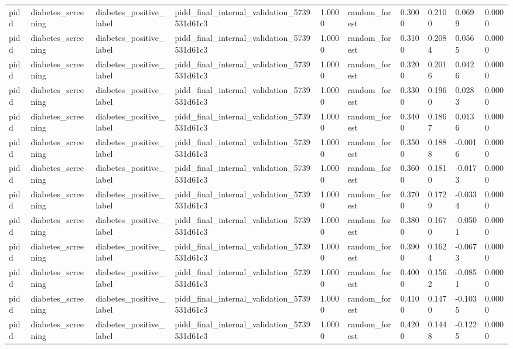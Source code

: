 \begin{tabular}{llllllllll}
pidd & diabetes\_screening & diabetes\_positive\_label & pidd\_final\_internal\_validation\_5739531d61c3 & 1.0000 & random\_forest & 0.3000 & 0.2100 & 0.0699 & 0.0000 \\
pidd & diabetes\_screening & diabetes\_positive\_label & pidd\_final\_internal\_validation\_5739531d61c3 & 1.0000 & random\_forest & 0.3100 & 0.2084 & 0.0565 & 0.0000 \\
pidd & diabetes\_screening & diabetes\_positive\_label & pidd\_final\_internal\_validation\_5739531d61c3 & 1.0000 & random\_forest & 0.3200 & 0.2016 & 0.0426 & 0.0000 \\
pidd & diabetes\_screening & diabetes\_positive\_label & pidd\_final\_internal\_validation\_5739531d61c3 & 1.0000 & random\_forest & 0.3300 & 0.1960 & 0.0283 & 0.0000 \\
pidd & diabetes\_screening & diabetes\_positive\_label & pidd\_final\_internal\_validation\_5739531d61c3 & 1.0000 & random\_forest & 0.3400 & 0.1867 & 0.0136 & 0.0000 \\
pidd & diabetes\_screening & diabetes\_positive\_label & pidd\_final\_internal\_validation\_5739531d61c3 & 1.0000 & random\_forest & 0.3500 & 0.1888 & -0.0016 & 0.0000 \\
pidd & diabetes\_screening & diabetes\_positive\_label & pidd\_final\_internal\_validation\_5739531d61c3 & 1.0000 & random\_forest & 0.3600 & 0.1810 & -0.0173 & 0.0000 \\
pidd & diabetes\_screening & diabetes\_positive\_label & pidd\_final\_internal\_validation\_5739531d61c3 & 1.0000 & random\_forest & 0.3700 & 0.1729 & -0.0334 & 0.0000 \\
pidd & diabetes\_screening & diabetes\_positive\_label & pidd\_final\_internal\_validation\_5739531d61c3 & 1.0000 & random\_forest & 0.3800 & 0.1670 & -0.0501 & 0.0000 \\
pidd & diabetes\_screening & diabetes\_positive\_label & pidd\_final\_internal\_validation\_5739531d61c3 & 1.0000 & random\_forest & 0.3900 & 0.1624 & -0.0673 & 0.0000 \\
pidd & diabetes\_screening & diabetes\_positive\_label & pidd\_final\_internal\_validation\_5739531d61c3 & 1.0000 & random\_forest & 0.4000 & 0.1562 & -0.0851 & 0.0000 \\
pidd & diabetes\_screening & diabetes\_positive\_label & pidd\_final\_internal\_validation\_5739531d61c3 & 1.0000 & random\_forest & 0.4100 & 0.1470 & -0.1035 & 0.0000 \\
pidd & diabetes\_screening & diabetes\_positive\_label & pidd\_final\_internal\_validation\_5739531d61c3 & 1.0000 & random\_forest & 0.4200 & 0.1448 & -0.1225 & 0.0000 \\

\end{tabular}
